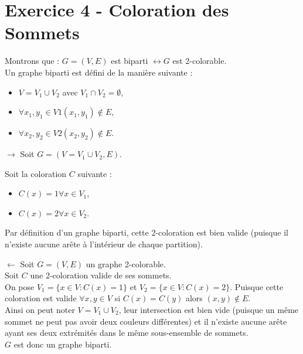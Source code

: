 
\section{Exercice 4 - Coloration des Sommets}\label{ex4}
Montrons que : $G = (V,E)$ est biparti $\leftrightarrow G$ est 2-colorable.\\
Un graphe biparti est d\'efini de la mani\`ere suivante :

\begin{itemize}
	\item $V = V_1 \cup V_2$ avec $V_1 \cap V_2 = \emptyset$,
	\item $\forall x_1,y_1 \in V1 (x_1,y_1) \notin E$,
	\item $\forall x_2,y_2 \in V2 (x_2,y_2) \notin E$.
\end{itemize}

$\rightarrow$ Soit $G = (V = V_1 \cup V_2,E)$.

Soit la coloration $C$ suivante :

\begin{itemize}
	\item $C(x) = 1 \forall x \in V_1$,
	\item $C(x) = 2 \forall x \in V_2$.
\end{itemize}
Par d\'efinition d'un graphe biparti, cette 2-coloration est bien valide (puisque il
n'existe aucune ar\^ete \`a l'int\'erieur de chaque partition).

$\leftarrow$ Soit $G = (V,E)$ un graphe 2-colorable.\\
Soit $C$ une 2-coloration valide de ses sommets.\\
On pose $V_1 = \{x \in V : C(x) = 1\}$ et $V_2 = \{x \in V : C(x) = 2\}$.
Puisque cette coloration est valide $\forall x,y \in V$ si $C(x) = C(y)$ alors
$(x,y) \notin E$.\\
Ainsi on peut noter $V = V_1 \cup V_2$, leur intersection est bien vide (puisque un
m\^eme sommet ne peut pas avoir deux couleurs diff\'erentes) et il n'existe aucune
ar\^ete ayant ses deux extr\'emit\'es dans le m\^eme sous-ensemble de sommets.\\
$G$ est donc un graphe biparti.

